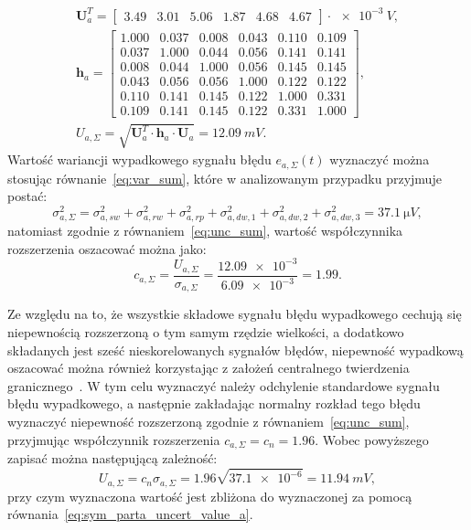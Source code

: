 \begin{gather}
\mathbf{U}_{a}^{T} =
\begin{bmatrix}
\num{3.49} & \num{3.01} & \num{5.06} & \num{1.87} & \num{4.68} & \num{4.67}
\end{bmatrix} \cdot \qty{e-3}{V}
\label{eq:sym_parta_uncert_vector_val}, \\
\mathbf{h}_{a} =
\begin{bmatrix}
\num{1.000} & \num{0.037} & \num{0.008} & \num{0.043} & \num{0.110} & \num{0.109} \\
\num{0.037} & \num{1.000} & \num{0.044} & \num{0.056} & \num{0.141} & \num{0.141} \\
\num{0.008} & \num{0.044} & \num{1.000} & \num{0.056} & \num{0.145} & \num{0.145} \\
\num{0.043} & \num{0.056} & \num{0.056} & \num{1.000} & \num{0.122} & \num{0.122} \\
\num{0.110} & \num{0.141} & \num{0.145} & \num{0.122} & \num{1.000} & \num{0.331} \\
\num{0.109} & \num{0.141} & \num{0.145} & \num{0.122} & \num{0.331} & \num{1.000}
\end{bmatrix}
\label{eq:sym_parta_uncert_coher_val}, \\
U_{a,\Sigma} = \sqrt{\mathbf{U}_{a}^{T} \cdot \mathbf{h}_{a} \cdot \mathbf{U}_{a}} = \qty{12.09}{mV} \label{eq:sym_parta_uncert_value_a}.
\end{gather}
Wartość wariancji wypadkowego sygnału błędu $e_{a,\Sigma}(t)$ wyznaczyć można stosując równanie~\eqref{eq:var_sum}, które w analizowanym przypadku przyjmuje postać:
\begin{equation}
\sigma_{a,\Sigma}^{2} = \sigma_{a,sw}^{2} + \sigma_{a,rw}^{2} + \sigma_{a,rp}^{2} + \sigma_{a,dw,1}^{2} + \sigma_{a,dw,2}^{2} + \sigma_{a,dw,3}^{2} = \qty{37.1}{\micro V} \label{eq:sym_parta_var_sum},
\end{equation}
natomiast zgodnie z równaniem~\eqref{eq:unc_sum}, wartość współczynnika rozszerzenia oszacować można jako:
\begin{equation}
c_{a,\Sigma} = \frac{U_{a,\Sigma}}{\sigma_{a,\Sigma}} = \frac{\num{12.09e-3}}{\num{6.09e-3}} = \num{1.99} \label{eq:sym_parta_uncert_factor}.
\end{equation}

Ze względu na to, że wszystkie składowe sygnału błędu wypadkowego cechują się niepewnością rozszerzoną o tym samym rzędzie wielkości, a dodatkowo składanych jest sześć nieskorelowanych sygnałów błędów, niepewność wypadkową oszacować można również korzystając z założeń centralnego twierdzenia granicznego~\cite{jcgm_guide}. W tym celu wyznaczyć należy odchylenie standardowe sygnału błędu wypadkowego, a następnie zakładając normalny rozkład tego błędu wyznaczyć niepewność rozszerzoną zgodnie z równaniem~\eqref{eq:unc_sum}, przyjmując współczynnik rozszerzenia $c_{a,\Sigma} = c_{n} = \num{1.96}$. Wobec powyższego zapisać można następującą zależność:
\begin{equation}
U_{a,\Sigma} = c_{n} \sigma_{a,\Sigma} = \num{1.96} \sqrt{\num{37.1e-6}} = \qty{11.94}{mV} \label{eq:sym_parta_uncert_value_b},
\end{equation}
przy czym wyznaczona wartość jest zbliżona do wyznaczonej za pomocą równania~\eqref{eq:sym_parta_uncert_value_a}.

